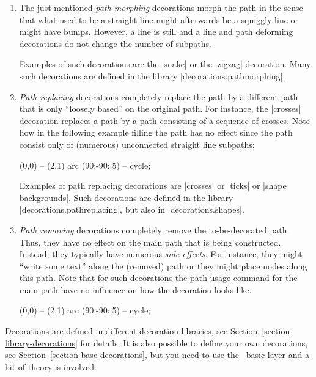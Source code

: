 \begin{enumerate}
\item The just-mentioned \emph{path morphing} decorations morph the
  path in the sense that what used to be a straight  line might
  afterwards be a squiggly line or might have bumps. However, a line
  is still and a line and path deforming decorations do not change
  the number of subpaths. 

  Examples of such decorations are the |snake| or the |zigzag|
  decoration. Many such decorations are defined in the library
  |decorations.pathmorphing|.
  
\item \emph{Path replacing} decorations completely replace the
  path by a different path that is only ``loosely based'' on the
  original path. For instance, the |crosses| decoration replaces a path
  by a path consisting of a sequence of crosses. Note how in the
  following example filling the path has no effect since the path
  consist only of (numerous) unconnected straight line subpaths:
\begin{codeexample}[]
\tikz \fill [decorate,decoration={crosses}]
  [fill=blue!20,draw=blue,thick] (0,0) -- (2,1) arc (90:-90:.5) -- cycle;
\end{codeexample}

  Examples of path replacing decorations are |crosses| or |ticks| or
  |shape backgrounds|. Such decorations are defined in the library
  |decorations.pathreplacing|, but also in |decorations.shapes|.
  
\item \emph{Path removing} decorations completely remove the
  to-be-decorated path. Thus, they have no effect on the main path
  that is being constructed. Instead, they typically have numerous
  \emph{side  effects}. For instance, they might ``write some text''
  along the (removed) path or they might place nodes along this
  path. Note that for such decorations the path usage command for the
  main path have no influence on how the decoration looks like.

\begin{codeexample}[]
\tikz \fill [decorate,decoration={text along path,
               text=This is a text along a path. Note how the path is lost.}]
  [fill=blue!20,draw=blue,thick] (0,0) -- (2,1) arc (90:-90:.5) -- cycle;
\end{codeexample}
\end{enumerate}

Decorations are defined in different decoration libraries, see
Section~\ref{section-library-decorations} for details. It is also
possible to define your own decorations, see
Section~\ref{section-base-decorations}, but you need to use the
\pgfname\ basic layer and a bit of theory is involved.

